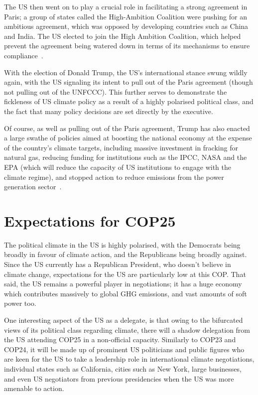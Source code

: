 The US then went on to play a crucial role in facilitating a strong
agreement in Paris; a group of states called the High-Ambition
Coalition were pushing for an ambitious agreement, which was opposed
by developing countries such as China and India. The US elected to
join the High Ambition Coalition, which helped prevent the agreement
being watered down in terms of its mechanisms to ensure
compliance~\cite{parker2018climate}.

With the election of Donald Trump, the US’s international stance swung
wildly again, with the US signaling its intent to pull out of the
Paris agreement (though not pulling out of the UNFCCC). This further serves to
demonstrate the fickleness of US climate policy as a result of a
highly polarised political class, and the fact that many policy decisions are
set directly by the executive.

Of course, as well as pulling out of the Paris agreement, Trump has
also enacted a large swathe of policies aimed at boosting the national
economy at the expense of the country’s climate targets, including
massive investment in fracking for natural gas, reducing funding for
institutions such as the IPCC, NASA and the EPA (which will reduce the capacity
of US institutions to engage with the climate regime), and stopped action to
reduce emissions from the power generation sector~\cite{aei292720}.

\section{Expectations for COP25}

The political climate in the US is highly polarised, with the
Democrats being broadly in favour of climate action, and the
Republicans being broadly against. Since the US currently has a Republican
President, who doesn’t believe in climate change, expectations for the
US are particularly low at this COP. That said, the US remains a
powerful player in negotiations; it has a huge economy which contributes
massively to global GHG emissions, and vast amounts of soft power too.

One interesting aspect of the US as a delegate, is that owing to the
bifurcated views of its political class regarding climate, there will
 a shadow delegation from the US attending COP25 in a non-official
capacity. Similarly to COP23 and COP24, it will be made up of prominent US
politicians and public figures who are keen for the US to take a
leadership role in international climate negotiations, individual
states such as California, cities such as New York, large businesses,
and even US negotiators from previous presidencies when the US was
more amenable to action.

